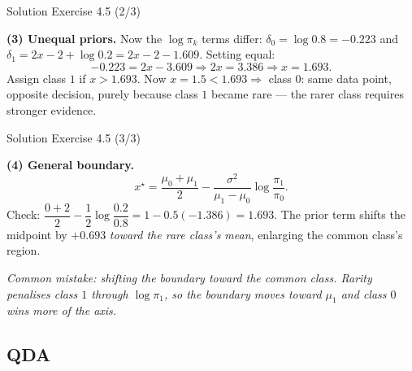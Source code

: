 \documentclass[aspectratio=169,11pt]{beamer}
\begin{document}
\begin{frame}{Solution \textemdash{} Exercise 4.5 (2/3)}
\begin{solutionbox}
\textbf{(3) Unequal priors.} Now the $\log\pi_k$ terms differ:
$\delta_0=\log 0.8=-0.223$ and $\delta_1=2x-2+\log 0.2=2x-2-1.609$.
Setting equal:
\[
  -0.223 = 2x - 3.609 \Rightarrow 2x = 3.386 \Rightarrow x = 1.693 .
\]
Assign class $1$ if $x>1.693$. Now $x=1.5<1.693 \Rightarrow$ class $0$:
same data point, opposite decision, purely because class $1$ became
rare --- the rarer class requires stronger evidence.

\vspace{1mm}
\end{solutionbox}
\end{frame}

\begin{frame}{Solution \textemdash{} Exercise 4.5 (3/3)}
\begin{solutionbox}
\textbf{(4) General boundary.}
\[
  x^\star = \frac{\mu_0+\mu_1}{2}
          - \frac{\sigma^2}{\mu_1-\mu_0}\log\frac{\pi_1}{\pi_0}.
\]
Check: $\dfrac{0+2}{2}-\dfrac{1}{2}\log\dfrac{0.2}{0.8}
= 1 - 0.5(-1.386) = 1.693.$ \checkmark\quad
The prior term shifts the midpoint by $+0.693$ \emph{toward the rare
class's mean}, enlarging the common class's region.

\vspace{1mm}
\emph{Common mistake: shifting the boundary toward the \emph{common}
class. Rarity penalises class $1$ through $\log\pi_1$, so the boundary
moves toward $\mu_1$ and class $0$ wins more of the axis.}
\end{solutionbox}
\end{frame}

\subsection{QDA}
\end{document}
